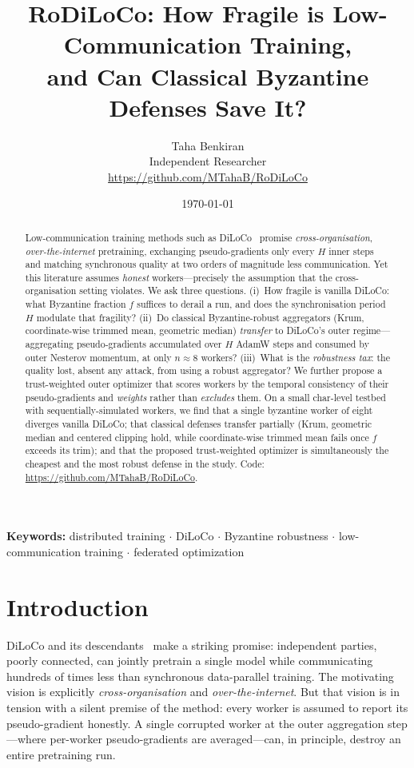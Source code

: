 \documentclass[11pt]{article}
\title{\textbf{RoDiLoCo}: How Fragile is Low-Communication Training,\\[2pt]
  and Can Classical Byzantine Defenses Save It?}
\author{Taha Benkiran\\[2pt]\small Independent Researcher\\[1pt]
  \small \url{https://github.com/MTahaB/RoDiLoCo}}
\date{\today}
\begin{document}
\maketitle

\begin{center}\vspace{-1.2em}
\small\textbf{Keywords:} distributed training $\cdot$ DiLoCo $\cdot$ Byzantine robustness
$\cdot$ low-communication training $\cdot$ federated optimization
\end{center}

\begin{abstract}
Low-communication training methods such as DiLoCo~\citep{diloco2023} promise
\emph{cross-organisation}, \emph{over-the-internet} pretraining, exchanging pseudo-gradients
only every $H$ inner steps and matching synchronous quality at two orders of magnitude less
communication. Yet this literature assumes \emph{honest} workers---precisely the assumption
that the cross-organisation setting violates. We ask three questions. (i)~How fragile is
vanilla DiLoCo: what Byzantine fraction $f$ suffices to derail a run, and does the
synchronisation period $H$ modulate that fragility? (ii)~Do classical Byzantine-robust
aggregators (Krum, coordinate-wise trimmed mean, geometric median) \emph{transfer} to
DiLoCo's outer regime---aggregating pseudo-gradients accumulated over $H$ AdamW steps and
consumed by outer Nesterov momentum, at only $n\!\approx\!8$ workers? (iii)~What is the
\emph{robustness tax}: the quality lost, absent any attack, from using a robust aggregator?
We further propose a trust-weighted outer optimizer that scores workers by the temporal
consistency of their pseudo-gradients and \emph{weights} rather than \emph{excludes} them.
On a small char-level testbed with sequentially-simulated workers, we find that a single
byzantine worker of eight diverges vanilla DiLoCo; that classical defenses transfer partially
(Krum, geometric median and centered clipping hold, while coordinate-wise trimmed mean fails
once $f$ exceeds its trim); and that the proposed trust-weighted optimizer is simultaneously
the cheapest and the most robust defense in the study. Code:
\url{https://github.com/MTahaB/RoDiLoCo}.
\end{abstract}

\section{Introduction}
\label{sec:intro}
DiLoCo and its descendants~\citep{diloco2023,streamingdiloco2025,dilocoscaling2025} make a
striking promise: independent parties, poorly connected, can jointly pretrain a single model
while communicating hundreds of times less than synchronous data-parallel training. The
motivating vision is explicitly \emph{cross-organisation} and \emph{over-the-internet}. But
that vision is in tension with a silent premise of the method: every worker is assumed to
report its pseudo-gradient honestly. A single corrupted worker at the outer aggregation
step---where per-worker pseudo-gradients are averaged---can, in principle, destroy an entire
pretraining run.
\end{document}
